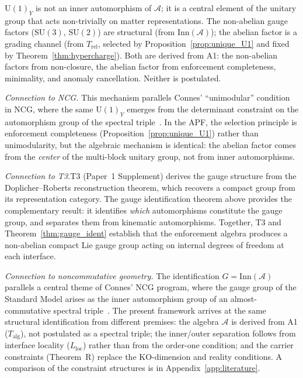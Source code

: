 \documentclass[11pt,a4paper]{article}
\theoremstyle{definition}
\newcommand{\SU}{\mathrm{SU}}
\newcommand{\U}{\mathrm{U}}
\begin{document}
$\U(1)_Y$ is not an inner automorphism of $\mathcal{A}$; it is a
central element of the unitary group that acts non-trivially on matter
representations.  The non-abelian gauge factors ($\SU(3)$, $\SU(2)$)
are structural (from $\mathrm{Inn}(\mathcal{A})$); the abelian factor
is a grading channel (from $T_{\mathrm{rel}}$,
selected by Proposition~\ref{prop:unique_U1} and fixed by
Theorem~\ref{thm:hypercharge}).  Both are derived from A1:
the non-abelian factors from non-closure, the abelian factor from
enforcement completeness, minimality, and anomaly cancellation.
Neither is postulated.

\smallskip\noindent\textit{Connection to NCG.}\quad
This mechanism parallels Connes' ``unimodular'' condition in NCG, where
the same $\U(1)_Y$ emerges from the determinant constraint on the
automorphism group of the spectral triple~\cite{Connes1996}.  In the APF,
the selection principle is enforcement completeness
(Proposition~\ref{prop:unique_U1}) rather than unimodularity, but the
algebraic mechanism is identical: the abelian factor comes from the
\emph{center} of the multi-block unitary group, not from inner
automorphisms.

\noindent\textit{Connection to T3.}\quad T3 (Paper~1 Supplement) derives
the gauge structure from the Doplicher--Roberts reconstruction theorem,
which recovers a compact group from its representation category.  The
gauge identification theorem above provides the complementary result:
it identifies \emph{which} automorphisms constitute the gauge group,
and separates them from kinematic automorphisms.  Together, T3 and
Theorem~\ref{thm:gauge_ident} establish that the enforcement algebra
produces a non-abelian compact Lie gauge group acting on internal
degrees of freedom at each interface.

\smallskip\noindent\textit{Connection to noncommutative geometry.}\quad
The identification $G = \mathrm{Inn}(\mathcal{A})$ parallels a central
theme of Connes' NCG program, where the gauge group of the Standard
Model arises as the inner automorphism group of an almost-commutative
spectral triple~\cite{Connes1996}.  The present framework arrives at
the same structural identification from different premises: the algebra
$\mathcal{A}$ is derived from A1 ($T_{\mathrm{alg}}$), not postulated
as a spectral triple; the inner/outer separation follows from interface
locality ($L_{\mathrm{loc}}$) rather than from the order-one condition;
and the carrier constraints (Theorem~R) replace the KO-dimension and
reality conditions.  A comparison of the constraint structures is in
Appendix~\ref{app:literature}.
\end{document}
